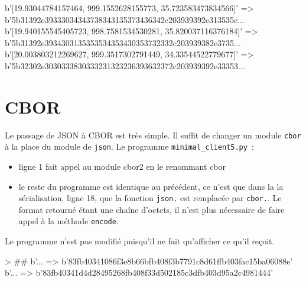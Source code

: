 \begin{termc}[backgroundcolor=\color{palerod}, language=json, basicstyle=\ttfamily\tiny, escapechar=@]
b'[19.93044784157464, 999.1552628155773, 35.723583473834566]' => b'5b31392e39333034343738343135373436342c203939392e313535c...
b'[19.940155545405723, 998.7581534530281, 35.820037116376184]' => b'5b31392e3934303135353534353430353732332c203939382e3735...
b'[20.003803212269627, 999.3517302791449, 34.33544522779677]' => b'5b32302e3030333830333231323236393632372c203939392e33353...
\end{termc}

\section{CBOR}

\begin{figure}
\end{figure}

Le passage de JSON à CBOR est très simple. Il suffit de changer un module \texttt{cbor} à la place du module de \texttt{json}. Le programme \texttt{minimal\_client5.py}~:
\begin{itemize}
    \item ligne 1 fait appel au module cbor2 en le renommant cbor
    \item le reste du programme est identique au précédent, ce n'est que dans la la sérialisation, ligne 18, que la fonction \texttt{json.} est remplacée par \texttt{cbor.}. Le format retourné étant une chaîne d'octets, il n'est plus nécessaire de faire appel à la méthode \texttt{encode}.
\end{itemize}


     \vspace{1em}


Le programme  n'est pas modifié puisqu'il ne fait qu'afficher ce qu'il reçoit. 







\begin{termc}[backgroundcolor=\color{palerod}, language=json, basicstyle=\ttfamily\small, escapechar=#]
> ##
b'... => b'83fb40341086f3e8b66bfb408f3b7791c8d61ffb403fac15ba06088e'
b'... => b'83fb40341d4d28495268fb408f33d502185c3dfb403d95a2c4981444'
\end{termc}



